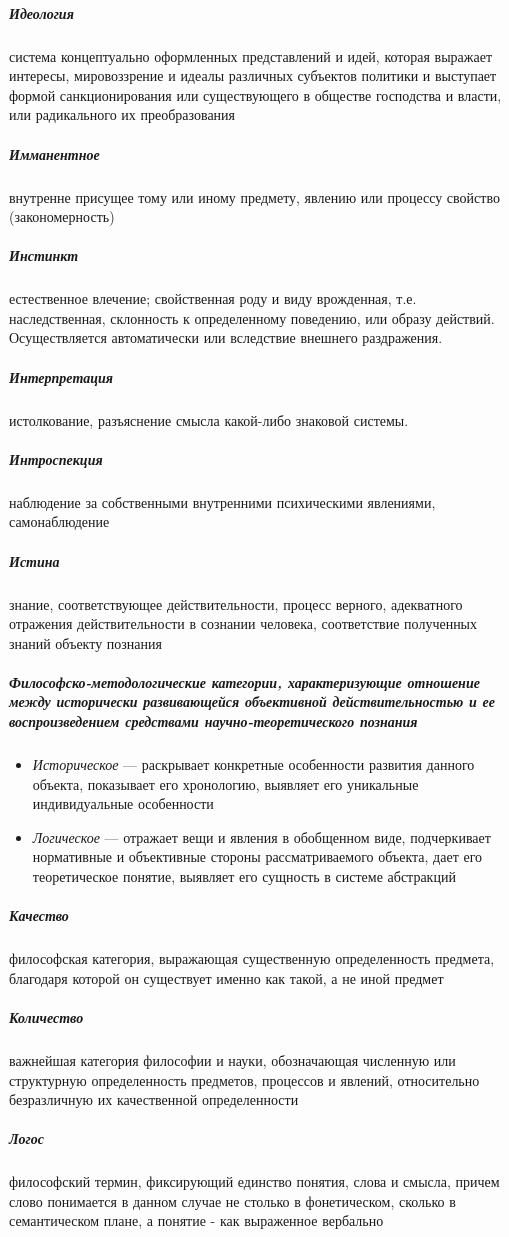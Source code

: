 \documentclass[a4paper, 12pt]{article}
\theoremstyle{plain} %
\theoremstyle{definition} %
\theoremstyle{remark} %
\begin{document}
\subparagraph{Идеология}
	система концептуально оформленных представлений и идей, которая выражает интересы, мировоззрение и идеалы различных субъектов политики и выступает формой санкционирования или существующего в обществе господства и власти, или радикального их преобразования

\subparagraph{Имманентное}
	внутренне присущее тому или иному предмету, явлению или процессу свойство (закономерность)

\subparagraph{Инстинкт}
	естественное влечение; свойственная роду и виду врожденная, т.е. наследственная, склонность к определенному поведению, или образу действий. Осуществляется автоматически или вследствие внешнего раздражения.

\subparagraph{Интерпретация}
	 истолкование, разъяснение смысла какой-либо знаковой системы.

\subparagraph{Интроспекция}
	наблюдение за собственными внутренними психическими явлениями, самонаблюдение

\subparagraph{Истина}
	знание, соответствующее действительности, процесс верного, адекватного отражения действительности в сознании человека, соответствие полученных знаний объекту познания

\subparagraph{Философско-методологические категории, характеризующие отношение между исторически развивающейся объективной действительностью и ее воспроизведением средствами научно-теоретического познания}
\begin{itemize}
	\item[] \emph{Историческое} --- раскрывает конкретные особенности развития данного объекта, показывает его хронологию, выявляет его уникальные индивидуальные особенности
	\item[] \emph{Логическое} --- отражает вещи и явления в обобщенном виде, подчеркивает нормативные и объективные стороны рассматриваемого объекта, дает его теоретическое понятие, выявляет его сущность в системе абстракций
\end{itemize}

\subparagraph{Качество}
	философская категория, выражающая существенную определенность предмета, благодаря которой он существует именно как такой, а не иной предмет

\subparagraph{Количество}
	важнейшая категория философии и науки, обозначающая численную или структурную определенность предметов, процессов и явлений, относительно безразличную их качественной определенности

\subparagraph{Логос}
	философский термин, фиксирующий единство понятия, слова и смысла, причем слово понимается в данном случае не столько в фонетическом, сколько в семантическом плане, а понятие - как выраженное вербально
\end{document}
